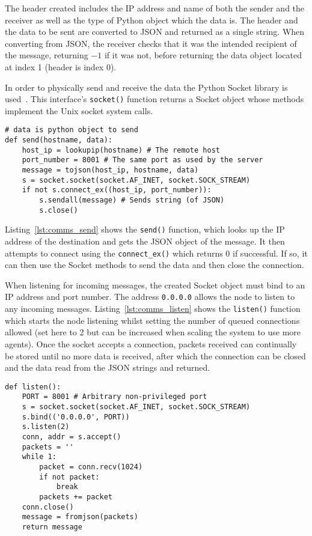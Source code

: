 The header created includes the IP address and name of both the sender and the
receiver as well as the type of Python object which the data is. The header
and the data to be sent are converted to JSON and returned as a single
string. When converting from JSON, the receiver checks that it was the
intended recipient of the message, returning $-1$ if it was not, before
returning the data object located at index 1 (header is index 0).

In order to physically send and receive the data the Python Socket library
is used~\cite{socketServerDocs}. This interface's \verb|socket()| function
returns a Socket object whose methods implement the Unix socket system calls.

\begin{lstlisting}[caption={send() Function}, label={lst:comms_send}]
# data is python object to send
def send(hostname, data):
    host_ip = lookupip(hostname) # The remote host
    port_number = 8001 # The same port as used by the server
    message = tojson(host_ip, hostname, data)
    s = socket.socket(socket.AF_INET, socket.SOCK_STREAM)
    if not s.connect_ex((host_ip, port_number)):
        s.sendall(message) # Sends string (of JSON)
        s.close()
\end{lstlisting}

Listing~\ref{lst:comms_send} shows the \verb|send()| function, which looks up the IP address of the destination and gets the JSON
object of the message. It then attempts to connect using the \verb|connect_ex()|
which returns 0 if successful. If so, it can then use the Socket methods to send
the data and then close the connection.

When listening for incoming messages, the created Socket object must bind to
an IP address and port number. The address \verb|0.0.0.0| allows the node to listen
to any incoming messages. Listing~\ref{lst:comms_listen} shows the \verb|listen()| function which starts the node listening
whilst setting the number of queued connections allowed (set here to 2 but can
be increased when scaling the system to use more agents). Once the socket
accepts a connection, packets received can continually be stored
until no more data is received, after which the connection can be closed and
the data read from the JSON strings and returned.

\begin{lstlisting}[caption={\texttt{listen()} function}, label={lst:comms_listen}]
def listen():
    PORT = 8001 # Arbitrary non-privileged port
    s = socket.socket(socket.AF_INET, socket.SOCK_STREAM)
    s.bind(('0.0.0.0', PORT))
    s.listen(2)
    conn, addr = s.accept()
    packets = ''
    while 1:
        packet = conn.recv(1024)
        if not packet:
            break
        packets += packet
    conn.close()
    message = fromjson(packets)
    return message
\end{lstlisting}

